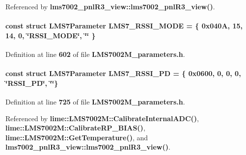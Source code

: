 Referenced by {\bf lms7002\+\_\+pnl\+R3\+\_\+view\+::lms7002\+\_\+pnl\+R3\+\_\+view()}.

\paragraph[{L\+M\+S7\+\_\+\+R\+S\+S\+I\+\_\+\+M\+O\+DE}]{\setlength{\rightskip}{0pt plus 5cm}const struct {\bf L\+M\+S7\+Parameter} L\+M\+S7\+\_\+\+R\+S\+S\+I\+\_\+\+M\+O\+DE = \{ 0x040\+A, 15, 14, 0, \char`\"{}\+R\+S\+S\+I\+\_\+\+M\+O\+D\+E\char`\"{}, \char`\"{}\char`\"{} \}\hspace{0.3cm}{\ttfamily [static]}}\label{LMS7002M__parameters_8h_ac9f9caa1fc106fef190efe2abbd4a875}


Definition at line {\bf 602} of file {\bf L\+M\+S7002\+M\+\_\+parameters.\+h}.

\paragraph[{L\+M\+S7\+\_\+\+R\+S\+S\+I\+\_\+\+PD}]{\setlength{\rightskip}{0pt plus 5cm}const struct {\bf L\+M\+S7\+Parameter} L\+M\+S7\+\_\+\+R\+S\+S\+I\+\_\+\+PD = \{ 0x0600, 0, 0, 0, \char`\"{}\+R\+S\+S\+I\+\_\+\+P\+D\char`\"{}, \char`\"{}\char`\"{}\}\hspace{0.3cm}{\ttfamily [static]}}\label{LMS7002M__parameters_8h_a82ed29dffff43ea3ebed9f8a1be9c88a}


Definition at line {\bf 725} of file {\bf L\+M\+S7002\+M\+\_\+parameters.\+h}.



Referenced by {\bf lime\+::\+L\+M\+S7002\+M\+::\+Calibrate\+Internal\+A\+D\+C()}, {\bf lime\+::\+L\+M\+S7002\+M\+::\+Calibrate\+R\+P\+\_\+\+B\+I\+A\+S()}, {\bf lime\+::\+L\+M\+S7002\+M\+::\+Get\+Temperature()}, and {\bf lms7002\+\_\+pnl\+R3\+\_\+view\+::lms7002\+\_\+pnl\+R3\+\_\+view()}.

